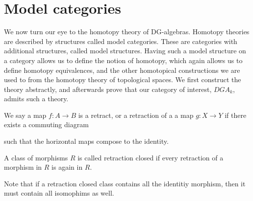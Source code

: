 
\section{Model categories}

We now turn our eye to the homotopy theory of DG-algebras. Homotopy theories are described by structures called model categories. These are categories with additional structures, called model structures. Having such a model structure on a category allows us to define the notion of homotopy, which again allows us to define homotopy equivalences, and the other homotopical constructions we are used to from the homotopy theory of topological spaces. We first construct the theory abstractly, and afterwards prove that our category of interest, $DGA_k$, admits such a theory. 

\begin{definition}[Retraction]
    We say a map $f:A\longrightarrow B$ is a retract, or a retraction of a a map $g:X\longrightarrow Y$ if there exists a commuting diagram 
\begin{center}
\end{center}
such that the horizontal maps compose to the identity. 
\end{definition}

\begin{definition}
A class of morphisms $R$ is called retraction closed if every retraction of a morphism in $R$ is again in $R$. 
\end{definition}

Note that if a retraction closed class contains all the identitiy morphism, then it must contain all isomophims as well. 



